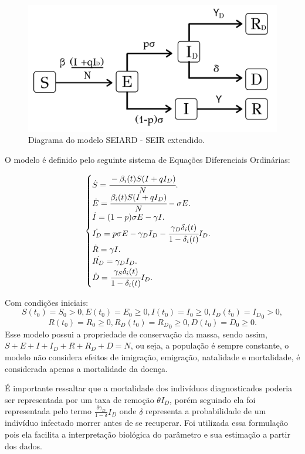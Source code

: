 \documentclass[12pt]{article}
\begin{document}
\begin{figure}[h!]
    \centering
    \includegraphics[scale = 0.3]{fluxograma.png}
    \caption{Diagrama do modelo SEIARD - SEIR extendido.}
\end{figure}


O modelo é definido pelo seguinte sistema de Equações Diferenciais Ordinárias:

\begin{center}
$$
\begin{cases}
\dot S = \cfrac{-\beta_i(t)S(I + qI_D)}{N}. \\
\dot E = \cfrac{\beta_i(t)S(I + qI_D)}{N} - \sigma E. \\
\dot {I} = (1-p)\sigma E - \gamma I.\\
\dot {I_D} = p\sigma E - \gamma_DI_D - \cfrac{\gamma_D \delta_i (t)}{1 - \delta_i(t)}I_D.\\
\dot {R} = \gamma I.\\
\dot {R_D} = \gamma_DI_D.\\
\dot {D} = \cfrac{\gamma_S \delta_i(t)}{1 - \delta_i(t)}I_D.

\end{cases}
$$
\end{center}

\noindent Com condições iniciais: $$S(t_0) = S_0 > 0, E(t_0) = E_0 \geq 0, I(t_0) = I_0 \geq 0, I_D(t_0) = {I_D}_0 > 0,$$
$$R(t_0) = R_0 \geq 0, R_D(t_0) = {R_D}_0 \geq 0, D(t_0) = D_0 \geq 0.$$ Esse modelo possui a propriedade de conservação da massa, sendo assim, $S + E + I + I_D + R + R_D + D = N$, ou seja, a população é sempre constante, o modelo não considera efeitos de imigração, emigração, natalidade e mortalidade, é considerada apenas a mortalidade da doença.

É importante ressaltar que a mortalidade dos indivíduos diagnosticados poderia ser representada por um taxa de remoção $\theta I_D$, porém seguindo \cite{keeling2011modeling} ela foi representada pelo termo $\frac{\delta \gamma_D }{1 - \delta} I_D$ onde $\delta$ representa a probabilidade de um indivíduo infectado morrer antes de se recuperar. Foi utilizada essa formulação pois ela facilita a interpretação biológica do parâmetro e sua estimação a partir dos dados.
\end{document}
